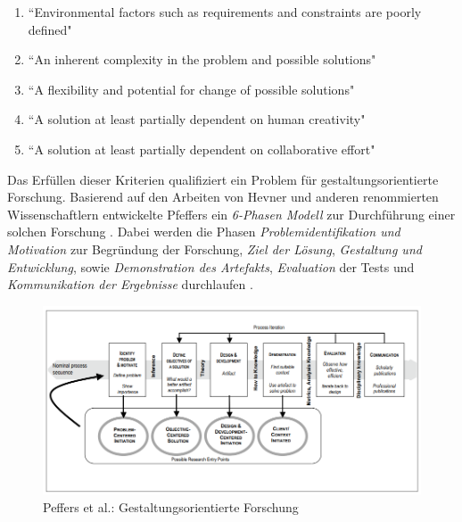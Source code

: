 \begin{enumerate}
	\item ``Environmental factors such as requirements and constraints are poorly defined"
	\item ``An inherent complexity in the problem and possible solutions"
	\item ``A flexibility and potential for change of possible solutions"
	\item ``A solution at least partially dependent on human creativity"
	\item ``A solution at least partially dependent on collaborative effort"
\end{enumerate}

Das Erfüllen dieser Kriterien qualifiziert ein Problem für gestaltungsorientierte Forschung. Basierend auf den Arbeiten von Hevner und anderen renommierten Wissenschaftlern entwickelte Pfeffers ein \textit{6-Phasen Modell} zur Durchführung einer solchen Forschung \cite{j._ellis_guide_2010}. Dabei werden die Phasen \textit{Problemidentifikation und Motivation} zur Begründung der Forschung, \textit{Ziel der Lösung}, \textit{Gestaltung und Entwicklung}, sowie \textit{Demonstration des Artefakts}, \textit{Evaluation} der Tests und \textit{Kommunikation der Ergebnisse} durchlaufen \cite{peffers_design_2007}. 

\begin{figure}[h]
	\begin{center}
		\noindent\includegraphics[width=\linewidth,height=\textheight,keepaspectratio]{Resources/DS_Peffers.png}
		\caption{Peffers et al.: Gestaltungsorientierte Forschung \cite{peffers_design_2007}}
	\end{center}
\end{figure}

